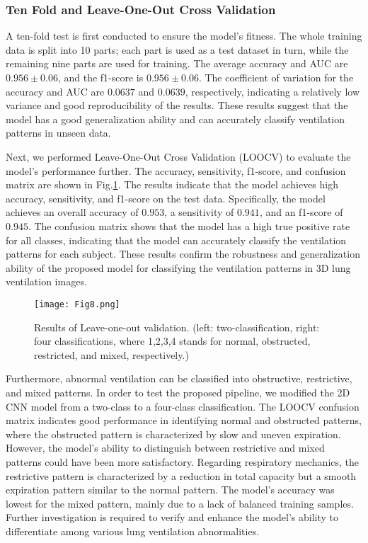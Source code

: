 \documentclass[journal,twoside,web]{ieeecolor}
\begin{document}
\subsubsection{Ten Fold and Leave-One-Out Cross Validation}
A ten-fold test is first conducted to ensure the model's fitness. The whole training data is split into 10 parts; each part is used as a test dataset in turn, while the remaining nine parts are used for training. The average accuracy and AUC are $0.956\pm 0.06$, and the f1-score is $0.956 \pm 0.06$. The coefficient of variation for the accuracy and AUC are $0.0637$ and $0.0639$, respectively, indicating a relatively low variance and good reproducibility of the results. These results suggest that the model has a good generalization ability and can accurately classify ventilation patterns in unseen data.

Next, we performed Leave-One-Out Cross Validation (LOOCV) to evaluate the model's performance further. The accuracy, sensitivity, f1-score, and confusion matrix are shown in Fig.\ref{LOO}. The results indicate that the model achieves high accuracy, sensitivity, and f1-score on the test data. Specifically, the model achieves an overall accuracy of $0.953$, a sensitivity of $0.941$, and an f1-score of $0.945$. The confusion matrix shows that the model has a high true positive rate for all classes, indicating that the model can accurately classify the ventilation patterns for each subject. These results confirm the robustness and generalization ability of the proposed model for classifying the ventilation patterns in 3D lung ventilation images.

\begin{figure}[!h] 
	\centering
	\texttt{[image: Fig8.png]}
	\caption{Results of Leave-one-out validation. (left: two-classification, right: four classifications, where 1,2,3,4 stands for normal, obstructed, restricted, and mixed, respectively.)}
	\label{LOO}
\end{figure}

Furthermore, abnormal ventilation can be classified into obstructive, restrictive, and mixed patterns. In order to test the proposed pipeline, we modified the 2D CNN model from a two-class to a four-class classification. The LOOCV confusion matrix indicates good performance in identifying normal and obstructed patterns, where the obstructed pattern is characterized by slow and uneven expiration. However, the model's ability to distinguish between restrictive and mixed patterns could have been more satisfactory. Regarding respiratory mechanics, the restrictive pattern is characterized by a reduction in total capacity but a smooth expiration pattern similar to the normal pattern. The model's accuracy was lowest for the mixed pattern, mainly due to a lack of balanced training samples. Further investigation is required to verify and enhance the model's ability to differentiate among various lung ventilation abnormalities.
\end{document}
